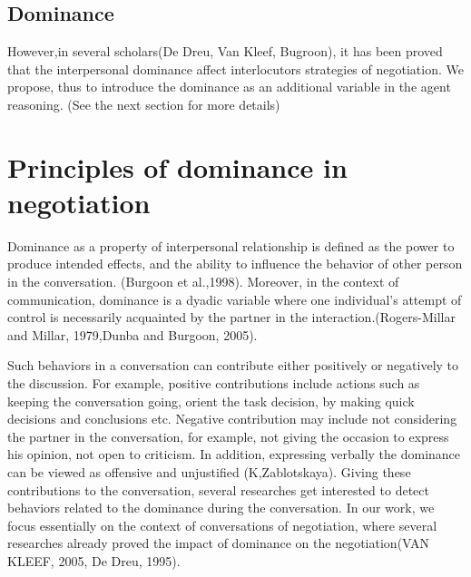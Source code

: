 \documentclass{article}
\begin{document}
	\title{\vskip -10pt}
	
	\author{Lydia Ould Ouali, Charles Rich \and
	Nicolas Sabouret }
	

	\begin{abstract}\vskip -20pt
	  
	\end{abstract}


\subsection{Dominance}

However,in several scholars(De Dreu, Van Kleef, Bugroon), it has been proved that the interpersonal dominance affect interlocutors strategies of negotiation. We propose, thus to introduce the dominance as an additional variable in the agent reasoning. (See the next section for more details)


\section{Principles of dominance in negotiation}
\par Dominance as a property of interpersonal relationship is defined as the power to produce intended effects, and the ability to influence the behavior of other person in the conversation. (Burgoon et al.,1998).
Moreover, in the context of communication, dominance is a dyadic variable where one individual's attempt of control is necessarily acquainted by the partner in the interaction.(Rogers-Millar and Millar, 1979,Dunba and Burgoon, 2005). 

\par Such behaviors in a conversation can contribute either positively or negatively to the discussion. For example, positive contributions include actions such as keeping the conversation going, orient the task decision, by making quick decisions and conclusions etc. Negative contribution may include not considering the partner in the conversation, for example, not giving the occasion to express his opinion, not open to criticism. In addition, expressing verbally the dominance can be viewed as offensive and unjustified (K,Zablotskaya). Giving these contributions to the conversation, several researches get interested to detect  behaviors related to the dominance during the conversation. In our work, we focus essentially on the context of conversations of negotiation, where several researches already proved the impact of dominance on the negotiation(VAN KLEEF, 2005, De Dreu, 1995). 
\end{document}
